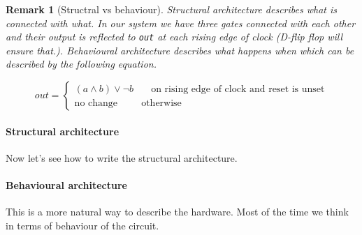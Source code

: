 \documentclass[a4paper,10pt]{article}
\newtheorem{remark}{Remark}
\begin{document}
\begin{remark}[Structral vs behaviour]
 
  Structural architecture describes \emph{what is connected with what}. In our
  system we have three gates connected with each other and their output is
  reflected to \texttt{out} at each rising edge of clock (D-flip flop will
  ensure that.). Behavioural architecture describes \emph{what happens when}
  which can be described by the following equation.

  \begin{equation}
  out = 
  \begin{cases}
    (a \land b) \lor \neg b & \quad \text{on rising edge of clock and reset
    is unset}\\
    \text{no change} & \text{otherwise} 
  \end{cases}
  \end{equation}
\end{remark}

\paragraph{Structural architecture}
  Now let's see how to write the structural architecture.

  

  \paragraph{Behavioural architecture}

  This is a more natural way to describe the hardware. Most of the time we think
  in terms of behaviour of the circuit. 
 
  
\end{document}
